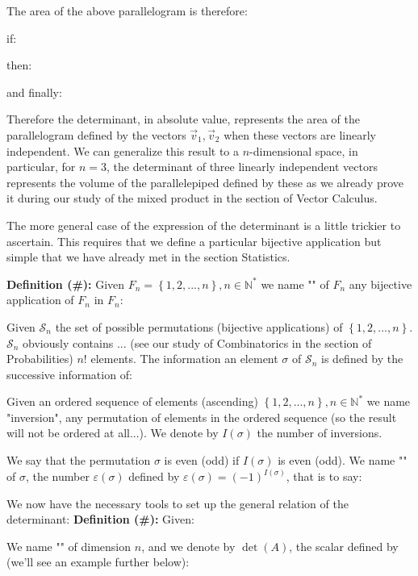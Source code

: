 	The area of the above parallelogram is therefore:
		
	if:
	
	then:
	
	and finally:
	
	Therefore the determinant, in absolute value, represents the area of the parallelogram defined by the vectors $\vec{v}_1,\vec{v}_2$ when these vectors are linearly independent. We can generalize this result to a $n$-dimensional space, in particular, for $n=3$, the determinant of three linearly independent vectors represents the volume of the parallelepiped defined by these as we already prove it during our study of the mixed product in the section of Vector Calculus.
	
	The more general case of the expression of the determinant is a little trickier to ascertain. This requires that we define a particular bijective application but simple that we have already met in the section Statistics.
	
	\textbf{Definition (\#\mydef):} Given $F_n=\left\lbrace 1,2,...,n\right\rbrace,n\in \mathbb{N}^{*}$ we name "" of $F_n$ any bijective application of $F_n$ in $F_n$:
	
	Given $\mathcal{S}_n$ the set of possible permutations (bijective applications) of $\left\lbrace 1,2,...,n\right\rbrace$.  $\mathcal{S}_n$ obviously contains ... (see our study of Combinatorics in the section of Probabilities) $n!$ elements. The information an element $\sigma$ of $\mathcal{S}_n$ is defined by the successive information of:
	
	Given an ordered sequence of elements (ascending) $\left\lbrace 1,2,...,n\right\rbrace,n \in \mathbb{N}^{*}$ we name "inversion", any permutation of elements in the ordered sequence (so the result will not be ordered at all...). We denote by $I(\sigma)$ the number of inversions.
	
	We say that the permutation $\sigma$ is even (odd) if $I(\sigma)$ is even (odd). We name "" of $\sigma$, the number $\varepsilon(\sigma)$ defined by $\varepsilon(\sigma)=(-1)^{I(\sigma)}$, that is to say:
	
	We now have the necessary tools to set up the general relation of the determinant:
	\textbf{Definition (\#\mydef):} Given:
	
	We name "" of dimension $n$, and we denote by $\det (A)$, the scalar defined by (we'll see an example further below):
	
